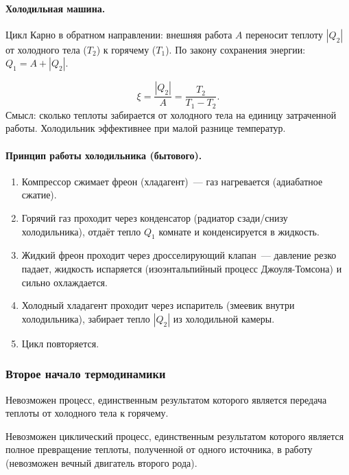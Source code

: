 \documentclass[12pt]{article}
\begin{document}
\paragraph{Холодильная машина.}
Цикл Карно в обратном направлении: внешняя работа $A$ переносит теплоту $|Q_2|$ от холодного тела ($T_2$) к горячему ($T_1$). По закону сохранения энергии: $Q_1 = A + |Q_2|$.

\begin{definition}
	\[
		\xi = \frac{|Q_2|}{A} = \frac{T_2}{T_1 - T_2}.
	\]
	Смысл: сколько теплоты забирается от холодного тела на единицу затраченной работы. Холодильник эффективнее при малой разнице температур.
\end{definition}

\paragraph{Принцип работы холодильника (бытового).}
\begin{enumerate}
	\item Компрессор сжимает фреон (хладагент)~--- газ нагревается (адиабатное сжатие).
	\item Горячий газ проходит через конденсатор (радиатор сзади/снизу холодильника), отдаёт тепло $Q_1$ комнате и конденсируется в жидкость.
	\item Жидкий фреон проходит через дросселирующий клапан~--- давление резко падает, жидкость испаряется (изоэнтальпийный процесс Джоуля-Томсона) и сильно охлаждается.
	\item Холодный хладагент проходит через испаритель (змеевик внутри холодильника), забирает тепло $|Q_2|$ из холодильной камеры.
	\item Цикл повторяется.
\end{enumerate}

\subsubsection{Второе начало термодинамики}

\begin{statement}
	Невозможен процесс, единственным результатом которого является передача теплоты от холодного тела к горячему.
\end{statement}

\begin{statement}
	Невозможен циклический процесс, единственным результатом которого является полное превращение теплоты, полученной от одного источника, в работу (невозможен вечный двигатель второго рода).
\end{statement}
\end{document}
